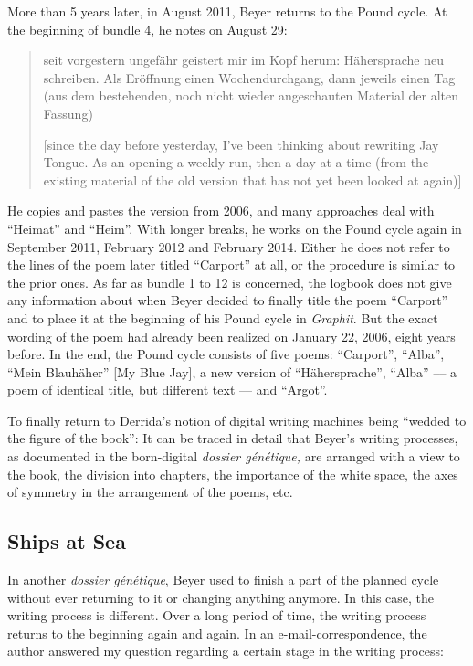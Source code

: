 \begin{paper}
More than 5 years later, in August 2011, Beyer returns to the Pound cycle. At
the beginning of bundle 4, he notes on August 29:

\begin{quote}
seit vorgestern ungefähr geistert mir im Kopf herum: Hähersprache neu
schreiben. Als Eröffnung einen Wochendurchgang, dann jeweils einen Tag
(aus dem bestehenden, noch nicht wieder angeschauten Material der alten
Fassung)

\vspace{1em}

[since the day before yesterday, I've been thinking about rewriting Jay
Tongue. As an opening a weekly run, then a day at a time (from the
existing material of the old version that has not yet been looked at
again)]
\end{quote}

He copies and pastes the version from 2006, and many approaches deal
with ``Heimat'' and ``Heim''. With longer breaks, he works on the Pound
cycle again in September 2011, February 2012 and February 2014. Either
he does not refer to the lines of the poem later titled ``Carport'' at
all, or the procedure is similar to the prior ones. As far as bundle 1
to 12 is concerned, the logbook does not give any information about when
Beyer decided to finally title the poem ``Carport'' and to place it at
the beginning of his Pound cycle in \emph{Graphit}. But the exact
wording of the poem had already been realized on January 22, 2006, eight
years before. In the end, the Pound cycle consists of five poems:
``Carport'', ``Alba'', ``Mein Blauhäher'' [My Blue Jay], a new version
of ``Hähersprache'', ``Alba'' –– a poem of identical title, but different
text –– and ``Argot''.

To finally return to Derrida's notion of digital writing machines being
``wedded to the figure of the book'': It can be traced in detail that
Beyer's writing processes, as documented in the born-digital
\emph{dossier génétique,} are arranged with a view to the book, the
division into chapters, the importance of the white space, the axes of
symmetry in the arrangement of the poems, etc.

\subsection*{Ships at Sea}

In another \emph{dossier génétique}, Beyer used to finish a part of the
planned cycle without ever returning to it or changing anything
anymore. In this case, the writing process is different. Over a long
period of time, the writing process returns to the beginning again and
again. In an e-mail-correspondence, the author answered my question
regarding a certain stage in the writing process:


\end{paper}
